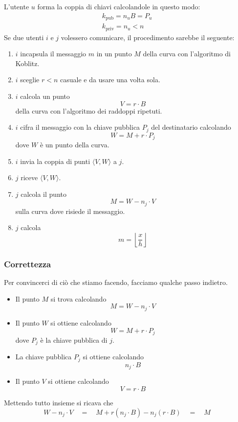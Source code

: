 L'utente $u$ forma la coppia di chiavi calcolandole in questo modo:
\[
	\begin{matrix}
		k_\text{pub} = n_u B = P_u \\
		k_\text{priv} = n_u < n
	\end{matrix}
\]
Se due utenti $i$ e $j$ volessero comunicare, il procedimento sarebbe il seguente:
\begin{enumerate}
	\item $i$ incapsula il messaggio $m$ in un punto $M$ della curva con l'algoritmo di Koblitz.
	\item $i$ sceglie $r < n$ casuale e da usare una volta sola.
	\item $i$ calcola un punto
	      \[ V = r \cdot B \]
	      della curva con l'algoritmo dei raddoppi ripetuti.
	\item $i$ cifra il messaggio con la chiave pubblica $P_j$ del destinatario calcolando
	      \[ W = M + r \cdot P_j \]
	      dove $W$ \`e un punto della curva.
	\item $i$ invia la coppia di punti $\langle V, W \rangle$ a $j$.
	\item $j$ riceve $\langle V, W \rangle$.
	\item $j$ calcola il punto
	      \[ M = W - n_j \cdot V \]
	      sulla curva dove risiede il messaggio.
	\item $j$ calcola
	      \[ m = \left\lfloor \frac{x}{h} \right\rfloor \]
\end{enumerate}

\subsubsection{Correttezza}
Per convincerci di ci\`o che stiamo facendo, facciamo qualche passo indietro.
\begin{itemize}
	\item Il punto $M$ si trova calcolando
	      \[ M = W - n_j \cdot V \]
	\item Il punto $W$ si ottiene calcolando
	      \[ W = M + r \cdot P_j \]
	      dove $P_j$ \`e la chiave pubblica di $j$.
	\item La chiave pubblica $P_j$ si ottiene calcolando
	      \[ n_j \cdot B \]
	\item Il punto $V$ si ottiene calcolando
	      \[ V = r \cdot B \]
\end{itemize}
Mettendo tutto insieme si ricava che
\[ W - n_j \cdot V \quad = \quad M + r (n_j \cdot B) - n_j (r \cdot B) \quad = \quad M \]

